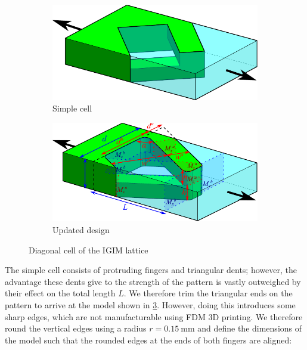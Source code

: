 \begin{figure}
	\centering
	\begin{subfigure}[B]{.49\columnwidth}
		\centering
		\includegraphics[width=\columnwidth]{sources/method/diagonal_model_simple_v5.pdf}
		\caption{Simple cell}
		\label{fig:diagonal_model_simple}
	\end{subfigure}
	\begin{subfigure}[B]{.8\columnwidth}
		\centering
		\includegraphics[width=\columnwidth]{sources/method/diagonal_model_v5.pdf}
		\caption{Updated design}
		\label{fig:diagonal_model}
	\end{subfigure}
	\caption{Diagonal cell of the IGIM lattice}
\end{figure}


The simple cell consists of protruding fingers and triangular dents;
however, the advantage these dents give to the strength of the pattern is vastly outweighed by their effect on the total length $L$.
We therefore trim the triangular ends on the pattern to arrive at the model shown in \cref{fig:diagonal_model}.
However, doing this introduces some sharp edges, which are not manufacturable using FDM 3D printing.
We therefore round the vertical edges using a radius $r=\SI{0.15}{\milli\meter}$
and define the dimensions of the model such that the rounded edges at the ends of both fingers are aligned:


